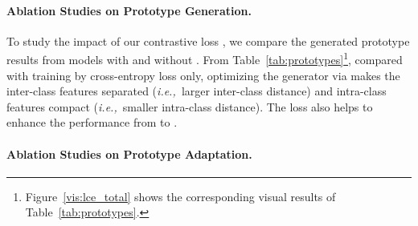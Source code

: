 \documentclass{article}
\def\ie{\emph{i.e.,~}}
\def\mata{\textcolor{black}}
\begin{document}
\paragraph{Ablation Studies on Prototype Generation.}


\begin{table}[t]
\vspace{-0.01in}
\renewcommand\arraystretch{1.4}
\setlength\tabcolsep{4pt}
    \begin{center}
\end{center}
    \vspace{-0.1in}
    \caption{\label{tab:prototypes}Ablation studies on prototype generation in the stage one with different losses. Inter-class distance and intra-class distance is based on cosine distance (range from 0 to 2). \mata{We report per-class accuracy (\%) after training the model on \textbf{VisDA} for 400 epochs}.}
\end{table}

To study the impact of our contrastive loss , we compare the generated prototype results from models with and without .
From Table~\ref{tab:prototypes}\footnote{Figure~\ref{vis:lce_total} shows the corresponding visual results of Table~\ref{tab:prototypes}.}, compared with training by cross-entropy loss  only, optimizing the generator via  makes the inter-class features separated (\ie larger inter-class distance) and intra-class features compact (\ie smaller intra-class distance).
The  loss also helps to enhance the performance from  to .





\paragraph{Ablation Studies on Prototype Adaptation.}
\end{document}

